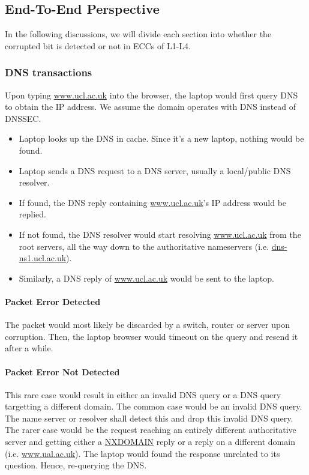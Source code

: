 \documentclass[12pt]{article}
\begin{document}
\subsection{End-To-End Perspective}

In the following discussions, we will divide each section into whether the corrupted bit is detected or not in ECCs of L1-L4.

\subsubsection{DNS transactions}

Upon typing \url{www.ucl.ac.uk} into the browser, the laptop would first query DNS to obtain the IP address. We assume the domain operates with DNS instead of DNSSEC.

\begin{itemize}
    \item Laptop looks up the DNS in cache. Since it's a new laptop, nothing would be found.
    \item Laptop sends a DNS request to a DNS server, usually a local/public DNS resolver.
    \item If found, the DNS reply containing \url{www.ucl.ac.uk}'s IP address would be replied.
    \item If not found, the DNS resolver would start resolving \url{www.ucl.ac.uk} from the root servers, all the way down to the authoritative nameservers (i.e. \url{dns-ns1.ucl.ac.uk}).
    \item Similarly, a DNS reply of \url{www.ucl.ac.uk} would be sent to the laptop.
\end{itemize}

\paragraph{Packet Error Detected}

The packet would most likely be discarded by a switch, router or server upon corruption. Then, the laptop browser would timeout on the query and resend it after a while. 

\paragraph{Packet Error Not Detected}

This rare case would result in either an invalid DNS query or a DNS query targetting a different domain. The common case would be an invalid DNS query. The name server or resolver shall detect this and drop this invalid DNS query. The rarer case would be the request reaching an entirely different authoritative server and getting either a \url{NXDOMAIN} reply or a reply on a different domain (i.e. \url{www.ual.ac.uk}). The laptop would found the response unrelated to its question. Hence, re-querying the DNS.
\end{document}
